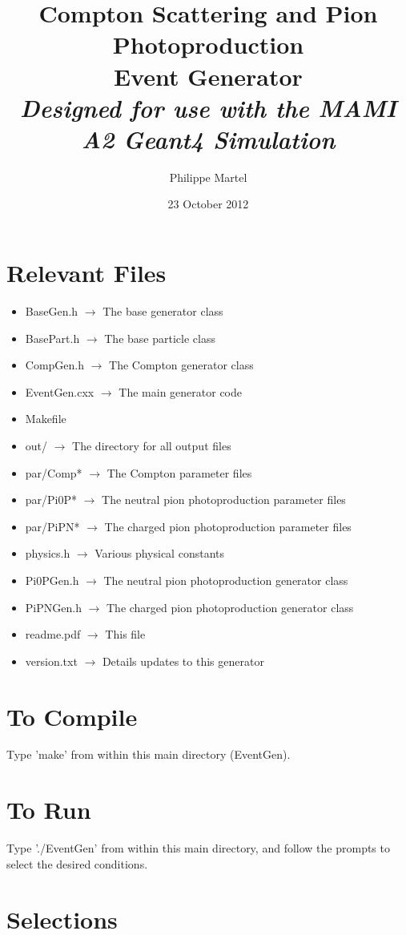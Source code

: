 \documentclass[twoside,letterpaper,12pt]{article}
\title{Compton Scattering and Pion Photoproduction\\Event Generator\\\vskip5mm\large\emph{Designed for use with the MAMI A2 Geant4 Simulation}}
\author{Philippe Martel}
\date{23 October 2012}
\begin{document}
\maketitle

\section{Relevant Files}
\begin{itemize}
\item BaseGen.h $\rightarrow$ The base generator class
\item BasePart.h $\rightarrow$ The base particle class
\item CompGen.h $\rightarrow$ The Compton generator class
\item EventGen.cxx $\rightarrow$ The main generator code
\item Makefile
\item out/ $\rightarrow$ The directory for all output files
\item par/Comp* $\rightarrow$ The Compton parameter files
\item par/Pi0P* $\rightarrow$ The neutral pion photoproduction parameter files
\item par/PiPN* $\rightarrow$ The charged pion photoproduction parameter files
\item physics.h $\rightarrow$ Various physical constants
\item Pi0PGen.h $\rightarrow$ The neutral pion photoproduction generator class
\item PiPNGen.h $\rightarrow$ The charged pion photoproduction generator class
\item readme.pdf $\rightarrow$ This file
\item version.txt $\rightarrow$ Details updates to this generator
\end{itemize}

\section{To Compile}
Type 'make' from within this main directory (EventGen).

\section{To Run}
Type './EventGen' from within this main directory, and follow the prompts to select the desired conditions.

\section{Selections}
\end{document}
